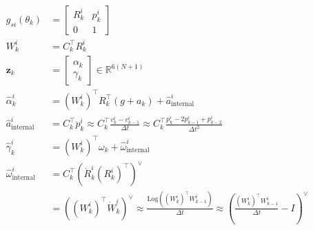 \documentclass[11pt]{article}
\begin{document}
\begin{align*}
    g_{si}(\theta_k) &= \begin{bmatrix}
        R_k^i & p_k^i \\
        0 & 1
    \end{bmatrix} \\
    W_k^i &= C_k^\top R_k^i \\
    \mathbf{z}_k &= \begin{bmatrix}
        \alpha_k \\ \gamma_k
    \end{bmatrix} \in \mathbb{R}^{6(N+1)} \\
    \hat{\alpha}_k^i &= (W_k^i)^\top R_k^\top (g + a_k) + \hat{a}^i_{\text{internal}} \\
    \hat{a}^i_{\text{internal}} &= C_k^\top \ddot{p}_k^i \approx C_k^\top \frac{v_k^i - v_{k-1}^i}{\Delta t} \approx C_k^\top \frac{p_k^i - 2p_{k-1}^i + p_{k-2}^i}{\Delta t^2} \\
    \hat{\gamma}_k^i &= (W_k^i)^\top \omega_k + \hat{\omega}^i_{\text{internal}} \\
    \hat{\omega}^i_{\text{internal}} &= C_k^\top\left(\dot{R}_k^i(R_{k}^i)^\top\right)^\vee \\
    &= \left((W_k^i)^\top \dot{W}_{k}^i\right)^\vee \approx \frac{\text{Log}\left((W_k^i)^\top W_{k-1}^i\right)}{\Delta t} \approx \left(\frac{(W_k^i)^\top W_{k-1}^i}{\Delta t} - I\right)^\vee
\end{align*}
\end{document}
